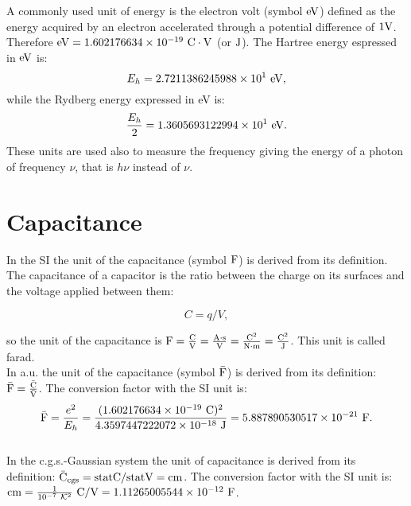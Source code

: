 \documentclass[12pt,a4paper,twoside]{report}
\def\e{1.602176634\times 10^{-19}}
\def\baru{4.3597447222072\times 10^{-18}}
\def\barc{1.602176634\times 10^{-19}}
\def\barphi{2.7211386245988\times 10^{1}}
\def\barcap{5.887890530517\times 10^{-21}}
\def\captocap{1.11265005544\times 10^{-12}}
\def\ryev{1.3605693122994\times 10^{1}}
\begin{document}
{{\color{red} A commonly used unit of energy is the electron volt (symbol ${\rm eV}$)
defined as the energy acquired by an electron accelerated through a
potential difference of $1 {\rm V}$. Therefore ${\rm eV}=\e\ {\rm C}\cdot {\rm V}$ (or ${\rm J}$).
The Hartree energy espressed in ${\rm eV}$ is: 
\begin{equation}
E_h=\barphi\ {\rm eV},
\end{equation}
while the Rydberg energy expressed in eV is:
\begin{equation}
{E_h \over 2}=\ryev\ {\rm eV}.
\end{equation}
These units are used also to measure the frequency giving the energy
of a photon of frequency $\nu$, that is $h \nu$ instead of $\nu$.
}

\newpage
{\color{coral}\section{Capacitance}}
\color{black}
In the SI the unit of the capacitance (symbol ${\rm F}$) is derived from its 
definition. The capacitance of a capacitor is the ratio between the charge
on its surfaces and the voltage applied between them:

\begin{tcolorbox}
\begin{equation}
C=q/V,
\end{equation}
\end{tcolorbox}

so the unit of the capacitance is ${\rm F}={{\rm C} \over {\rm V}}={{\rm A} \cdot {\rm s} \over {\rm V}}=
{{\rm C}^2 \over {\rm N} \cdot {\rm m}}
={{\rm C}^2 \over {\rm J}}$. This unit is called farad.
\\

{\color{web-blue} In a.u. the unit of the capacitance (symbol ${\rm \bar F}$) 
is derived from its definition: ${\rm \bar F}={{\rm \bar C} \over {\rm \bar V}}$. The 
conversion factor with the SI unit is:
\begin{equation}
{\rm \bar F} = {e^2 \over E_h} = {(\barc\ {\rm C})^2\over \baru\ {\rm J}}=\barcap\ {\rm F}.
\end{equation}
}
\\

{\color{orange} In the c.g.s.-Gaussian system the unit of capacitance
is derived from its definition: ${\rm \bar C_{cgs}}={\rm statC}/{\rm statV}=
{\rm cm}$. The 
conversion factor with the SI unit is:
${\rm cm}={1\over 10^{-7}\ \mathcal{K}^2}\ {\rm C}/{\rm V}=\captocap\ {\rm F}$.
}
\\

}
\end{document}
